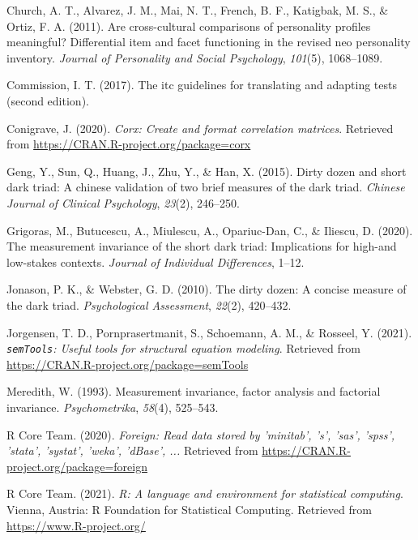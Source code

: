 \documentclass[
  english,
  man]{apa6}
\begin{document}
\leavevmode\hypertarget{ref-church2011cross}{}%
Church, A. T., Alvarez, J. M., Mai, N. T., French, B. F., Katigbak, M. S., \& Ortiz, F. A. (2011). Are cross-cultural comparisons of personality profiles meaningful? Differential item and facet functioning in the revised neo personality inventory. \emph{Journal of Personality and Social Psychology}, \emph{101}(5), 1068--1089.

\leavevmode\hypertarget{ref-itc_2017}{}%
Commission, I. T. (2017). The itc guidelines for translating and adapting tests (second edition).

\leavevmode\hypertarget{ref-R-corx}{}%
Conigrave, J. (2020). \emph{Corx: Create and format correlation matrices}. Retrieved from \url{https://CRAN.R-project.org/package=corx}

\leavevmode\hypertarget{ref-geng2015dirty}{}%
Geng, Y., Sun, Q., Huang, J., Zhu, Y., \& Han, X. (2015). Dirty dozen and short dark triad: A chinese validation of two brief measures of the dark triad. \emph{Chinese Journal of Clinical Psychology}, \emph{23}(2), 246--250.

\leavevmode\hypertarget{ref-grigoras2020measurement}{}%
Grigoras, M., Butucescu, A., Miulescu, A., Opariuc-Dan, C., \& Iliescu, D. (2020). The measurement invariance of the short dark triad: Implications for high-and low-stakes contexts. \emph{Journal of Individual Differences}, 1--12.

\leavevmode\hypertarget{ref-jonason2010dirty}{}%
Jonason, P. K., \& Webster, G. D. (2010). The dirty dozen: A concise measure of the dark triad. \emph{Psychological Assessment}, \emph{22}(2), 420--432.

\leavevmode\hypertarget{ref-R-semTools}{}%
Jorgensen, T. D., Pornprasertmanit, S., Schoemann, A. M., \& Rosseel, Y. (2021). \emph{\texttt{semTools}: Useful tools for structural equation modeling}. Retrieved from \url{https://CRAN.R-project.org/package=semTools}

\leavevmode\hypertarget{ref-meredith1993measurement}{}%
Meredith, W. (1993). Measurement invariance, factor analysis and factorial invariance. \emph{Psychometrika}, \emph{58}(4), 525--543.

\leavevmode\hypertarget{ref-R-foreign}{}%
R Core Team. (2020). \emph{Foreign: Read data stored by 'minitab', 's', 'sas', 'spss', 'stata', 'systat', 'weka', 'dBase', ...} Retrieved from \url{https://CRAN.R-project.org/package=foreign}

\leavevmode\hypertarget{ref-R-base}{}%
R Core Team. (2021). \emph{R: A language and environment for statistical computing}. Vienna, Austria: R Foundation for Statistical Computing. Retrieved from \url{https://www.R-project.org/}
\end{document}
